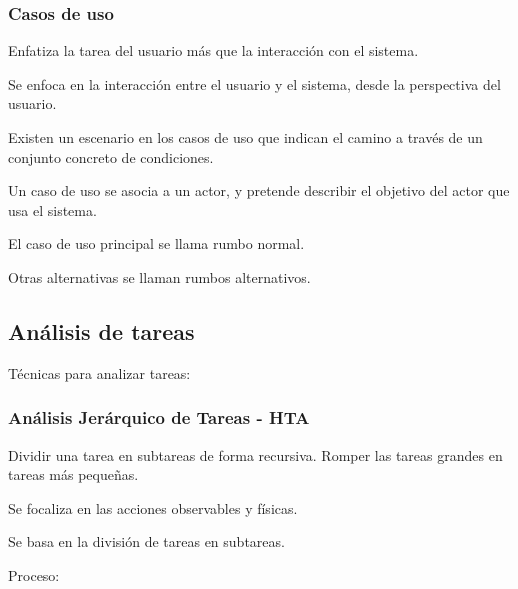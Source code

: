 \documentclass[12pt, twoside, openright]{report} %
\begin{document}
\subsubsection{Casos de uso}

      Enfatiza la tarea del usuario más que la interacción con el
      sistema.

      Se enfoca en la interacción entre el usuario y el sistema, desde
      la perspectiva del usuario.

      Existen un escenario en los casos de uso que indican el camino a
      través de un conjunto concreto de condiciones.

      Un caso de uso se asocia a un actor, y pretende describir el
      objetivo del actor que usa el sistema.

      El caso de uso principal se llama rumbo normal.

      Otras alternativas se llaman rumbos alternativos.
\pagebreak
\subsection{Análisis de tareas}


    Técnicas para analizar tareas:

    
\subsubsection{Análisis Jerárquico de Tareas - HTA}
      
      Dividir una tarea en
      subtareas de forma recursiva. Romper las tareas grandes en tareas
      más pequeñas.

      
        Se focaliza en las acciones observables y físicas.

        Se basa en la división de tareas en subtareas.

        Proceso:
\end{document}
